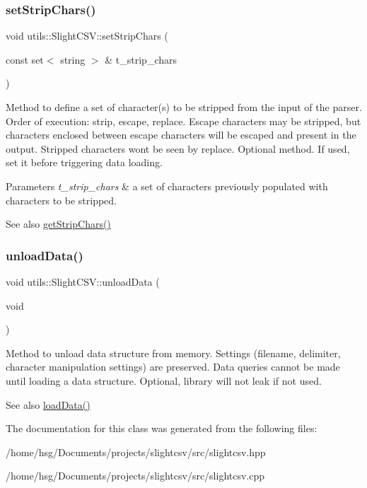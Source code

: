 \subsubsection{\texorpdfstring{set\+Strip\+Chars()}{setStripChars()}}
{\footnotesize\ttfamily void utils\+::\+Slight\+C\+S\+V\+::set\+Strip\+Chars (\begin{DoxyParamCaption}\item[{const set$<$ string $>$ \&}]{t\+\_\+strip\+\_\+chars }\end{DoxyParamCaption})}

Method to define a set of character(s) to be stripped from the input of the parser. Order of execution\+: strip, escape, replace. Escape characters may be stripped, but characters enclosed between escape characters will be escaped and present in the output. Stripped characters won\textquotesingle{}t be seen by replace. Optional method. If used, set it before triggering data loading. 
\begin{DoxyParams}{Parameters}
{\em t\+\_\+strip\+\_\+chars} & a set of characters previously populated with characters to be stripped. \\
\hline
\end{DoxyParams}
\begin{DoxySeeAlso}{See also}
\hyperlink{classutils_1_1SlightCSV_aa6b302e67d367daab0dc806624a627da}{get\+Strip\+Chars()} 
\end{DoxySeeAlso}
\mbox{\label{classutils_1_1SlightCSV_aaa9c8042d6231660cb08ada7c1a8dccb}} 
\subsubsection{\texorpdfstring{unload\+Data()}{unloadData()}}
{\footnotesize\ttfamily void utils\+::\+Slight\+C\+S\+V\+::unload\+Data (\begin{DoxyParamCaption}\item[{void}]{ }\end{DoxyParamCaption})}

Method to unload data structure from memory. Settings (filename, delimiter, character manipulation settings) are preserved. Data queries cannot be made until loading a data structure. Optional, library will not leak if not used. \begin{DoxySeeAlso}{See also}
\hyperlink{classutils_1_1SlightCSV_adea079ec76c9ee67d096f8fd39946380}{load\+Data()} 
\end{DoxySeeAlso}


The documentation for this class was generated from the following files\+:\begin{DoxyCompactItemize}
\item 
/home/hsg/\+Documents/projects/slightcsv/src/slightcsv.\+hpp\item 
/home/hsg/\+Documents/projects/slightcsv/src/slightcsv.\+cpp\end{DoxyCompactItemize}
